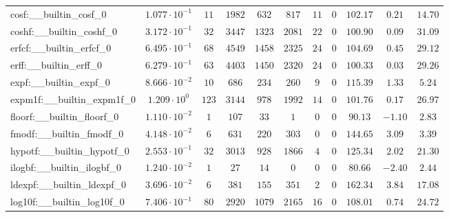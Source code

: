 \begin{tabular}{|l|c|c|c|c|c|c|c|c|c|c|}
cosf:\_\_builtin\_cosf\_0                 & $ 1.077 \cdot 10^{-1} $ & $ 11     $ & $ 1982  $ & $ 632   $ & $ 817   $ & $ 11  $ & $ 0 $ & $ 102.17      $ & $ 0.21    $ & $ 14.70   $ \\
coshf:\_\_builtin\_coshf\_0               & $ 3.172 \cdot 10^{-1} $ & $ 32     $ & $ 3447  $ & $ 1323  $ & $ 2081  $ & $ 22  $ & $ 0 $ & $ 100.90      $ & $ 0.09    $ & $ 31.09   $ \\
erfcf:\_\_builtin\_erfcf\_0               & $ 6.495 \cdot 10^{-1} $ & $ 68     $ & $ 4549  $ & $ 1458  $ & $ 2325  $ & $ 24  $ & $ 0 $ & $ 104.69      $ & $ 0.45    $ & $ 29.12   $ \\
erff:\_\_builtin\_erff\_0                 & $ 6.279 \cdot 10^{-1} $ & $ 63     $ & $ 4403  $ & $ 1450  $ & $ 2320  $ & $ 24  $ & $ 0 $ & $ 100.33      $ & $ 0.03    $ & $ 29.26   $ \\
expf:\_\_builtin\_expf\_0                 & $ 8.666 \cdot 10^{-2} $ & $ 10     $ & $ 686   $ & $ 234   $ & $ 260   $ & $ 9   $ & $ 0 $ & $ 115.39      $ & $ 1.33    $ & $ 5.24    $ \\
expm1f:\_\_builtin\_expm1f\_0             & $ 1.209 \cdot 10^{0}  $ & $ 123    $ & $ 3144  $ & $ 978   $ & $ 1992  $ & $ 14  $ & $ 0 $ & $ 101.76      $ & $ 0.17    $ & $ 26.97   $ \\
floorf:\_\_builtin\_floorf\_0             & $ 1.110 \cdot 10^{-2} $ & $ 1      $ & $ 107   $ & $ 33    $ & $ 1     $ & $ 0   $ & $ 0 $ & $ 90.13       $ & $ -1.10   $ & $ 2.83    $ \\
fmodf:\_\_builtin\_fmodf\_0               & $ 4.148 \cdot 10^{-2} $ & $ 6      $ & $ 631   $ & $ 220   $ & $ 303   $ & $ 0   $ & $ 0 $ & $ 144.65      $ & $ 3.09    $ & $ 3.39    $ \\
hypotf:\_\_builtin\_hypotf\_0             & $ 2.553 \cdot 10^{-1} $ & $ 32     $ & $ 3013  $ & $ 928   $ & $ 1866  $ & $ 4   $ & $ 0 $ & $ 125.34      $ & $ 2.02    $ & $ 21.30   $ \\
ilogbf:\_\_builtin\_ilogbf\_0             & $ 1.240 \cdot 10^{-2} $ & $ 1      $ & $ 27    $ & $ 14    $ & $ 0     $ & $ 0   $ & $ 0 $ & $ 80.66       $ & $ -2.40   $ & $ 2.44    $ \\
ldexpf:\_\_builtin\_ldexpf\_0             & $ 3.696 \cdot 10^{-2} $ & $ 6      $ & $ 381   $ & $ 155   $ & $ 351   $ & $ 2   $ & $ 0 $ & $ 162.34      $ & $ 3.84    $ & $ 17.08   $ \\
log10f:\_\_builtin\_log10f\_0             & $ 7.406 \cdot 10^{-1} $ & $ 80     $ & $ 2920  $ & $ 1079  $ & $ 2165  $ & $ 16  $ & $ 0 $ & $ 108.01      $ & $ 0.74    $ & $ 24.72   $ \\

\end{tabular}

